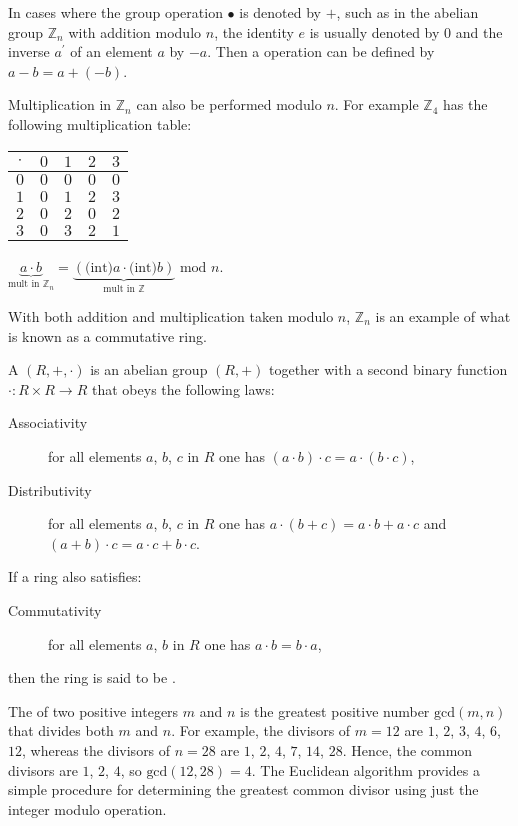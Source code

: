 In cases where the group operation $\bullet$ is denoted by $+$, such as in
the abelian group $\mathbb{Z}_n$ with addition modulo $n$,
the identity $e$ is usually denoted by $0$
and the inverse $a^\prime$ of an element $a$ by $-a$.
Then a  operation can be defined by $a-b=a+(-b)$.

Multiplication in $\mathbb{Z}_n$ can also be performed modulo $n$.
For example $\mathbb{Z}_4$ has the following multiplication table:

\begin{tabular}{|c|cccc|}\hline
  $\cdot$ & $0$ & $1$ & $2$ & $3$ \\ \hline
  $0$ & $0$ & $0$ & $0$ & $0$ \\
  $1$ & $0$ & $1$ & $2$ & $3$ \\
  $2$ & $0$ & $2$ & $0$ & $2$ \\
  $3$ & $0$ & $3$ & $2$ & $1$ \\ \hline
\end{tabular}
\qquad\qquad
$\underbrace{a\cdot b}_{\mbox{mult in }\mathbb{Z}_n}
= \underbrace{(\mbox{(int)}a\cdot\mbox{(int)}b)}_{\mbox{mult in }\mathbb{Z}} \mbox{ mod } n$.

\noindent With both addition and multiplication taken modulo $n$,
$\mathbb{Z}_n$ is an example of what is known as a commutative ring.

A  $(R,+,\cdot)$ is an abelian group $(R,+)$ together with a second binary function
$\cdot\colon R\times R\rightarrow R$ that obeys the following laws:
\begin{description}
  \item[Associativity] for all elements $a$, $b$, $c$ in $R$ one has
  $(a\cdot b)\cdot c = a\cdot(b\cdot c)$,
  \item[Distributivity] for all elements $a$, $b$, $c$ in $R$ one has
  $a\cdot(b+c)=a\cdot b + a\cdot c$ and $(a+b)\cdot c=a\cdot c+b\cdot c$.
\end{description}
If a ring also satisfies:
\begin{description}
  \item[Commutativity] for all elements $a$, $b$ in $R$ one has $a\cdot b=b\cdot a$,
\end{description}
then the ring is said to be .

The  of two positive integers $m$ and $n$
is the greatest positive number $\mbox{gcd}(m,n)$ that divides both $m$ and $n$.
For example, the divisors of $m=12$ are $1$, $2$, $3$, $4$, $6$, $12$,
whereas the divisors of $n=28$ are $1$, $2$, $4$, $7$, $14$, $28$.
Hence, the common divisors are $1$, $2$, $4$, so $\mbox{gcd}(12,28)=4$.
The Euclidean algorithm provides a simple procedure for determining the
greatest common divisor using just the integer modulo operation.

